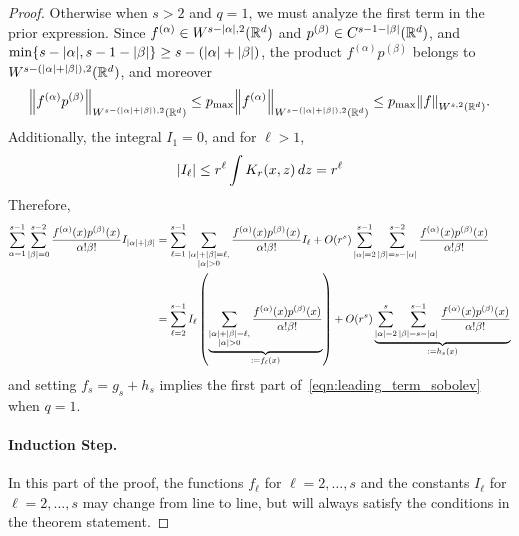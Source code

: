\documentclass{article}
\newcommand{\Reals}{\mathbb{R}}
\newcommand{\1}{\mathbf{1}}
\newcommand{\Rd}{\Reals^d}
\theoremstyle{alden}
\theoremstyle{aldenthm}
\theoremstyle{definition}
\theoremstyle{remark}
\begin{document}
\begin{proof}
	Otherwise when $s > 2$ and $q = 1$, we must analyze the first term in the prior expression. Since $f^{(\alpha)} \in W^{s - \abs{\alpha},2}(\Rd)$ and $p^{(\beta)} \in C^{s - 1 - \abs{\beta}}(\Rd)$, and $\min\{s - \abs{\alpha}, s - 1 - \abs{\beta}\} \geq s - (\abs{\alpha} + \abs{\beta})$, the product $f^{(\alpha)} p^{(\beta)}$ belongs to $W^{s - (\abs{\alpha} + \abs{\beta}),2}(\Rd)$, and moreover
	\begin{equation*}
	\norm{f^{(\alpha)} p^{(\beta)}}_{W^{s - (\abs{\alpha} + \abs{\beta}),2}(\Rd)} \leq p_{\max} \norm{f^{(\alpha)}}_{W^{s - (\abs{\alpha} + \abs{\beta}),2}(\Rd)} \leq p_{\max} \norm{f}_{W^{s,2}(\Rd)}.
	\end{equation*} 
	Additionally, the integral $I_1 = 0$, and for $\ell > 1$,
	\begin{equation*}
	\abs{I_{\ell}} \leq r^{\ell} \int K_r(x,z)\,dz = r^{\ell}
	\end{equation*}
	Therefore,
	\begin{align*}
	\sum_{\alpha = 1}^{s - 1} \sum_{\abs{\beta} = 0}^{s-2} \frac{f^{(\alpha)}(x)p^{(\beta)}(x)}{\alpha!\beta!} I_{\abs{\alpha} + \abs{\beta}} & = \sum_{\ell = 1}^{s - 1} \sum_{\substack{\abs{\alpha} + \abs{\beta} = \ell, \\ \abs{\alpha} > 0}} \frac{f^{(\alpha)}(x)p^{(\beta)}(x)}{\alpha!\beta!} I_{\ell} + O(r^{s}) \sum_{\abs{\alpha} = 2}^{s - 1} \sum_{\abs{\beta} = {s - \abs{\alpha}}}^{s - 2} \frac{f^{(\alpha)}(x)p^{(\beta)}(x)}{\alpha!\beta!} \\
	& = \sum_{\ell = 2}^{s - 1} I_{\ell} \left( \underbrace{\sum_{\substack{\abs{\alpha} + \abs{\beta} = \ell, \\ \abs{\alpha} > 0}} \frac{f^{(\alpha)}(x)p^{(\beta)}(x)}{\alpha!\beta!}}_{:= f_{\ell}(x)} \right) + O(r^{s}) \underbrace{\sum_{\abs{\alpha} = 2}^{s} \sum_{\abs{\beta} = {s - \abs{\alpha}}}^{s - 1} \frac{f^{(\alpha)}(x)p^{(\beta)}(x)}{\alpha!\beta!}}_{:=h_{s}(x)}
	\end{align*} 
	and setting $f_s = g_s + h_s$ implies the first part of~\eqref{eqn:leading_term_sobolev} when $q = 1$.
	
	\paragraph{Induction Step.}
	In this part of the proof, the functions $f_{\ell}$ for $\ell = 2,\ldots,s$ and the constants $I_{\ell}$ for $\ell = 2,\ldots,s$ may change from line to line, but will always satisfy the conditions in the theorem statement.
	

\end{proof}
\end{document}
